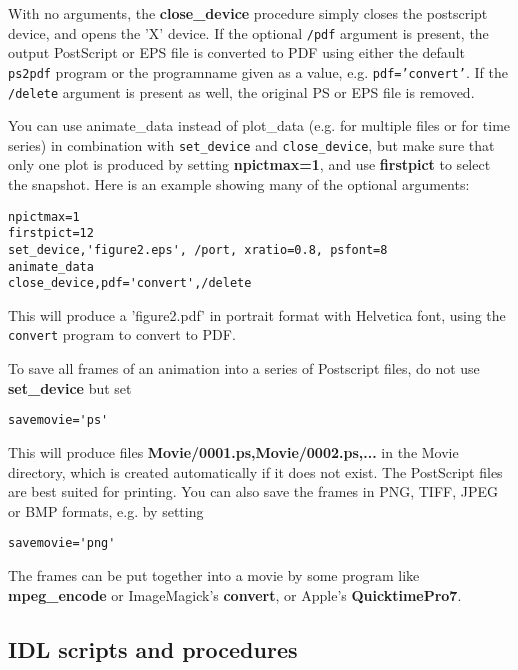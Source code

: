 \documentclass{article}
\begin{document}
With no arguments, the {\bf close\_device} procedure
simply closes the postscript device, and opens the 'X' device.
If the optional {\tt /pdf} argument is present, the output PostScript or EPS
file is converted to PDF using either the default {\tt ps2pdf} program 
or the programname given as a value, e.g. {\tt pdf='convert'}.
If the {\tt /delete} argument is present as well, the original PS or EPS file
is removed. 

You can use animate\_data instead of plot\_data (e.g. for multiple files or 
for time series) in combination with {\tt set\_device} and 
{\tt close\_device}, but make sure that only one plot is produced by setting
{\bf npictmax=1}, and use {\bf firstpict} to select the snapshot.
Here is an example showing many of the optional arguments:
\begin{verbatim}
npictmax=1
firstpict=12
set_device,'figure2.eps', /port, xratio=0.8, psfont=8
animate_data
close_device,pdf='convert',/delete
\end{verbatim}
This will produce a 'figure2.pdf' in portrait format with Helvetica font,
using the {\tt convert} program to convert to PDF.

To save all frames of an animation into a series of Postscript files, 
do not use {\bf set\_device} but set
\begin{verbatim}
savemovie='ps'
\end{verbatim}
This will produce files {\bf Movie/0001.ps,Movie/0002.ps,...} 
in the Movie directory, which is created automatically if it does
not exist. The PostScript files are best suited for printing.
You can also save the frames in PNG, TIFF, JPEG or BMP formats, e.g.
by setting 
\begin{verbatim}
savemovie='png'
\end{verbatim}
The frames can be put together into a movie by some program like
{\bf mpeg\_encode} or ImageMagick's {\bf convert}, or 
Apple's {\bf QuicktimePro7}. 

\subsection{IDL scripts and procedures \label{s-idl-script}}
\end{document}
